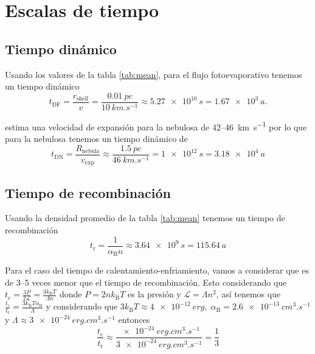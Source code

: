 \documentclass{book}
\begin{document}
\chapter{Escalas de tiempo}

\section{Tiempo dinámico}

Usando los valores de la tabla \ref{tab:mean}, para el flujo
fotoevaporativo tenemos un tiempo dinámico
\begin{equation}
t_\mathrm{DF} = \frac{r_\mathrm{shell}}{v} = \frac{\SI{0.01}{pc}}{\SI{10}{km.s^{-1}}}\approx \SI{5.27e10}{s}  = \SI{1.67e3}{a}.
\end{equation}

\cite{Mancherko:2010} estima una velocidad de expansión para la
nebulosa de 42--\SI{46}{km.s^{-1}} por lo que para la nebulosa tenemos
un tiempo dinámico de
\begin{equation}
t_\mathrm{DN}= \frac{R_\mathrm{nebula}}{v_\mathrm{exp}}\approx\frac{\SI{1.5}{pc}}{\SI{46}{km.s^{-1}}}= \SI{1e12}{s}=\SI{3.18e4}{a}
\end{equation}

\section{Tiempo de recombinación}

Usando la densidad promedio de la tabla \ref{tab:mean} tenemos un
tiempo de recombinación
\begin{equation}
t_\mathrm{r} = \frac{1}{\alpha_\mathrm{B} n} \approx \SI{3.64e9}{s}= \SI{115.64}{a}
\end{equation}

Para el caso del tiempo de calentamiento-enfriamiento, vamos a
considerar que es de 3--5 veces menor que el tiempo de recombinación.
Esto considerando que
$t_\mathrm{c}=\frac{3P}{2\mathcal{L}}=\frac{3k_\mathrm{B}T}{\Lambda n}$ donde
$P=2nk_\mathrm{B}T$ es la presión y $\mathcal{L}=\Lambda n^2$, así tenemos que
$\frac{t_\mathrm{c}}{t_\mathrm{r}}=\frac{3k_\mathrm{B}T\alpha_\mathrm{B}}{\Lambda}$
y considerando que
$3k_\mathrm{B}T\approx\SI{4e-12}{erg},\;
\alpha_\mathrm{B}=\SI{2.6e-13}{cm^3.s^{-1}}$ y
$\Lambda\approx\SI{3e-24}{erg.cm^3.s^{-1}}$ entonces
\begin{equation}
    \frac{t_\mathrm{c}}{t_\mathrm{r}}\approx\frac{\SI{e-24}{erg.cm^3.s^{-1}}}{\SI{3e-24}{erg.cm^3.s^{-1}}}=\frac{1}{3}
\end{equation}
\end{document}
